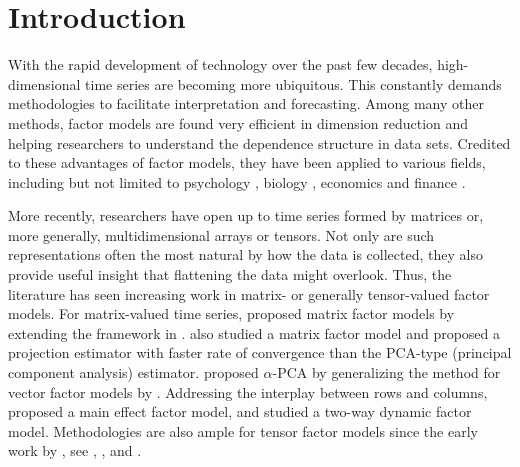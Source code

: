 \documentclass[aos]{imsart}
\theoremstyle{plain}
\theoremstyle{definition}
\begin{document}
\begin{frontmatter}
\begin{keyword}[class=MSC]
\end{keyword}

\begin{keyword}
\end{keyword}

\end{frontmatter}

\section{Introduction}
\label{sec: introduction}

With the rapid development of technology over the past few decades, high-dimensional time series are becoming more ubiquitous. This constantly demands methodologies to facilitate interpretation and forecasting. Among many other methods, factor models are found very efficient in dimension reduction and helping researchers to understand the dependence structure in data sets. Credited to these advantages of factor models, they have been applied to various fields, including but not limited to psychology \citep{McCraeJohn1992}, biology \citep{Hirzeletal2002, Hochreiteretal2006}, economics and finance \citep{ChamberlainRothschild1983, FamaFrench1993, StockWatson2002}.

More recently, researchers have open up to time series formed by matrices or, more generally, multidimensional arrays or tensors. Not only are such representations often the most natural by how the data is collected, they also provide useful insight that flattening the data might overlook. Thus, the literature has seen increasing work in matrix- or generally tensor-valued factor models. For matrix-valued time series, \cite{Wangetal2019} proposed matrix factor models by extending the framework in \cite{Lametal2011}. \cite{yu2022projected} also studied a matrix factor model and proposed a projection estimator with faster rate of convergence than the PCA-type (principal component analysis) estimator. \cite{ChenFan2023} proposed $\alpha$-PCA by generalizing the method for vector factor models by \cite{Bai2003}. Addressing the interplay between rows and columns, \cite{LamCen2024} proposed a main effect factor model, and \cite{Yuanetal2023} studied a two-way dynamic factor model. Methodologies are also ample for tensor factor models since the early work by \cite{Chenetal2022}, see  \cite{barigozzi2022statistical}, \cite{Hanetal2022}, and \cite{Hanetal2024}.
\end{document}
